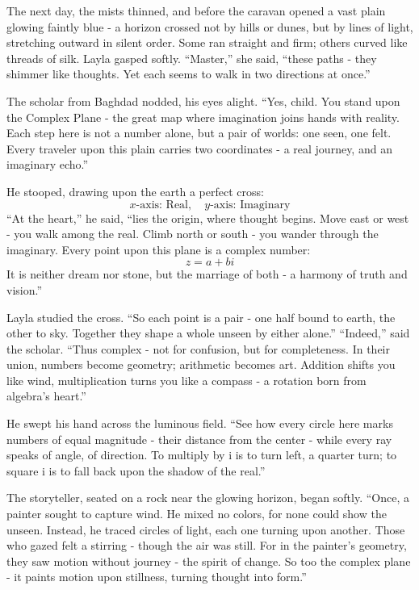 \documentclass[
  letterpaper,
  DIV=11,
  numbers=noendperiod]{scrreprt}
\begin{document}
The next day, the mists thinned, and before the caravan opened a vast
plain glowing faintly blue - a horizon crossed not by hills or dunes,
but by lines of light, stretching outward in silent order. Some ran
straight and firm; others curved like threads of silk. Layla gasped
softly. ``Master,'' she said, ``these paths - they shimmer like
thoughts. Yet each seems to walk in two directions at once.''

The scholar from Baghdad nodded, his eyes alight. ``Yes, child. You
stand upon the Complex Plane - the great map where imagination joins
hands with reality. Each step here is not a number alone, but a pair of
worlds: one seen, one felt. Every traveler upon this plain carries two
coordinates - a real journey, and an imaginary echo.''

He stooped, drawing upon the earth a perfect cross: \[
x\text{-axis: Real}, \quad y\text{-axis: Imaginary}
\] ``At the heart,'' he said, ``lies the origin, where thought begins.
Move east or west - you walk among the real. Climb north or south - you
wander through the imaginary. Every point upon this plane is a complex
number: \[
z = a + bi
\] It is neither dream nor stone, but the marriage of both - a harmony
of truth and vision.''

Layla studied the cross. ``So each point is a pair - one half bound to
earth, the other to sky. Together they shape a whole unseen by either
alone.'' ``Indeed,'' said the scholar. ``Thus complex - not for
confusion, but for completeness. In their union, numbers become
geometry; arithmetic becomes art. Addition shifts you like wind,
multiplication turns you like a compass - a rotation born from algebra's
heart.''

He swept his hand across the luminous field. ``See how every circle here
marks numbers of equal magnitude - their distance from the center -
while every ray speaks of angle, of direction. To multiply by i is to
turn left, a quarter turn; to square i is to fall back upon the shadow
of the real.''

The storyteller, seated on a rock near the glowing horizon, began
softly. ``Once, a painter sought to capture wind. He mixed no colors,
for none could show the unseen. Instead, he traced circles of light,
each one turning upon another. Those who gazed felt a stirring - though
the air was still. For in the painter's geometry, they saw motion
without journey - the spirit of change. So too the complex plane - it
paints motion upon stillness, turning thought into form.''
\end{document}
